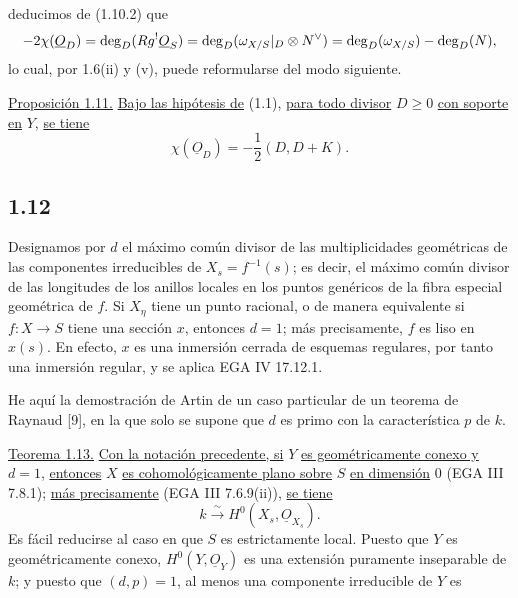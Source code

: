 \pageoriginale

deducimos de (1.10.2) que
\begin{equation*}
-2\chi(\underline{O}_D)
=\deg_D(Rg^{!}\underline{O}_{\sisi{D}{S}})
=\deg_D(\omega_{X/S}|_D\otimes N^{\vee})
=\deg_D(\omega_{X/S})-\deg_D(N),
\end{equation*}
lo cual, por 1.6\sisi{}{ }(ii) y (v), puede reformularse del modo siguiente.

\medskip
\noindent\underline{Proposición 1.11.}
\underline{Bajo las hipótesis de} (1.1), \underline{para todo divisor}
$D\geq0$ \underline{con soporte en} $Y$, \underline{se tiene}
\begin{equation*}
\chi(\underline{O}_D)=-\frac12(D,D+K).
\end{equation*}

\subsection*{1.12}
Designamos por $d$ el máximo común divisor de las multiplicidades geométricas de
las componentes irreducibles de $X_s=f^{-1}(s)$; es decir, el máximo común
divisor de las longitudes de los anillos locales en los puntos genéricos de la
fibra especial geométrica de $f$. Si $X_\eta$ tiene un punto racional, o de
manera equivalente si $f:X\longrightarrow S$ tiene una sección $x$, entonces
$d=1$; más precisamente, $f$ es liso en $x(s)$. En efecto, $x$ es una inmersión
cerrada de esquemas regulares, por tanto una inmersión regular, y se aplica EGA
IV 17.12.1.

He aquí la demostración de Artin de un caso particular de un teorema de Raynaud
[9], en la que solo se supone que $d$ es primo con la característica $p$ de
$k$.

\medskip
\noindent\underline{Teorema 1.13.}
\underline{Con la notación precedente, si} $Y$ \underline{es geométricamente
conexo y} $d=1$, \underline{entonces} $X$ \underline{es cohomológicamente
plano sobre} $S$ \underline{en dimensión} $0$ (EGA III 7.8.1);
\underline{más precisamente} (EGA III 7.6.9(ii)), \underline{se tiene}
\begin{equation*}
k\xrightarrow{\;\sim\;}H^0(X_s,\underline{O}_{X_s}).
\end{equation*}
Es fácil reducirse al caso en que $S$ es estrictamente local. Puesto que $Y$ es
geométricamente conexo, $H^0(Y,\underline{O}_Y)$ es una extensión puramente
inseparable de $k$; y puesto que $(d,p)=1$, al menos una componente irreducible
de $Y$ es

\pageoriginale

